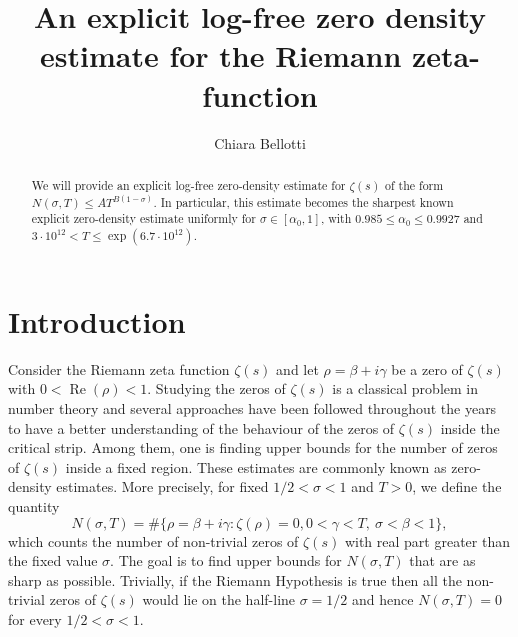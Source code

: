 \documentclass[reqno]{amsart}
\title[An explicit log-free zero density estimate ]{An explicit log-free zero density estimate for the Riemann zeta-function}
\author[C. Bellotti]{Chiara  Bellotti}
\numberwithin{equation}{section}
\theoremstyle{remark}
\begin{document}
\maketitle
\begin{abstract}
We will provide an explicit log-free zero-density estimate for $\zeta(s)$ of the form $N(\sigma,T)\le AT^{B(1-\sigma)}$. In particular, this estimate becomes the sharpest known explicit zero-density estimate uniformly for $\sigma\in[\alpha_0,1]$, with $0.985\le \alpha_0\le 0.9927$ and $3\cdot 10^{12}<T\le \exp(6.7\cdot 10^{12})$.
\end{abstract}
\section{Introduction}
Consider the Riemann zeta function $\zeta(s)$ and let $\rho=\beta+i\gamma$ be a zero of $\zeta(s)$ with $0<\operatorname{Re}(\rho)<1$. Studying the zeros of $\zeta(s)$ is a classical problem in number theory and several approaches have been followed throughout the years to have a better understanding of the behaviour of the zeros of $\zeta(s)$ inside the critical strip. Among them, one is finding upper bounds for the number of zeros of $\zeta(s)$ inside a fixed region. These estimates are commonly known as zero-density estimates. More precisely, for fixed $1/2<\sigma<1$ and $T>0$, we define the quantity$$
N(\sigma, T)=\#\{\rho=\beta+i \gamma: \zeta(\rho)=0,0<\gamma<T,\  \sigma<\beta<1\},
$$
which counts the number of non-trivial zeros of $\zeta(s)$ with real part greater than the fixed value $\sigma$. The goal is to find upper bounds for $N(\sigma,T)$ that are as sharp as possible. Trivially, if the Riemann Hypothesis is true then all the non-trivial zeros of $\zeta(s)$ would lie on the half-line $\sigma=1/2$ and hence $N(\sigma,T)=0$ for every $1/2<\sigma<1$.
\end{document}
